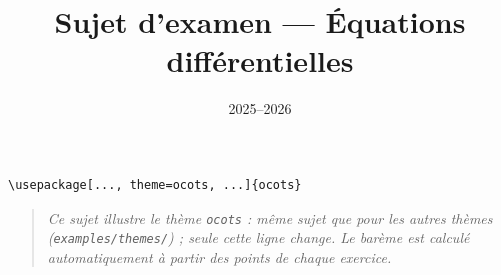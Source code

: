 \documentclass[11pt]{ocots-exam}
\title{Sujet d'examen --- Équations différentielles}
\date{2025--2026}
\begin{document}
\maketitle

\begin{lstlisting}
\usepackage[..., theme=ocots, ...]{ocots}
\end{lstlisting}
\begin{quote}\itshape
Ce sujet illustre le th\`eme \texttt{ocots} : m\^eme sujet que pour les
autres th\`emes (\texttt{examples/themes/}) ; seule cette ligne change.
Le bar\`eme est calcul\'e automatiquement \`a partir des points de chaque
exercice.
\end{quote}

\medskip

\end{document}

